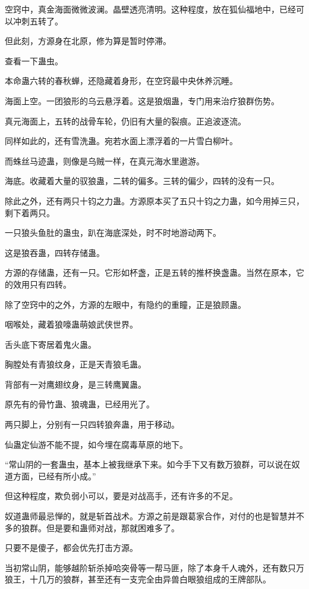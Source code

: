\begin{this_body}
空窍中，真金海面微微波澜。晶壁透亮清明。这种程度，放在狐仙福地中，已经可以冲刺五转了。

但此刻，方源身在北原，修为算是暂时停滞。

查看一下蛊虫。

本命蛊六转的春秋蝉，还隐藏着身形，在空窍最中央休养沉睡。

海面上空。一团狼形的乌云悬浮着。这是狼烟蛊，专门用来治疗狼群伤势。

真元海面上，五转的战骨车轮，仍旧有大量的裂痕。正追波逐流。

同样如此的，还有雪洗蛊。宛若水面上漂浮着的一片雪白柳叶。

而蛛丝马迹蛊，则像是乌贼一样，在真元海水里遨游。

海底。收藏着大量的驭狼蛊，二转的偏多。三转的偏少，四转的没有一只。

除此之外，还有两只十钧之力蛊。方源原本买了五只十钧之力蛊，如今用掉三只，剩下着两只。

一只狼头鱼肚的蛊虫，趴在海底深处，时不时地游动两下。

这是狼吞蛊，四转存储蛊。

方源的存储蛊，还有一只。它形如杯盏，正是五转的推杯换盏蛊。当然在原本，它的效用只有四转。

除了空窍中的之外，方源的左眼中，有隐约的重瞳，正是狼顾蛊。

咽喉处，藏着狼嚎蛊萌娘武侠世界。

舌头底下寄居着鬼火蛊。

胸膛处有青狼纹身，正是天青狼毛蛊。

背部有一对鹰翅纹身，是三转鹰翼蛊。

原先有的骨竹蛊、狼魂蛊，已经用光了。

两只脚上，分别有一只四转狼奔蛊，用于移动。

仙蛊定仙游不能不提，如今埋在腐毒草原的地下。

“常山阴的一套蛊虫，基本上被我继承下来。如今手下又有数万狼群，可以说在奴道方面，已经有所小成。”

但这种程度，欺负弱小可以，要是对战高手，还有许多的不足。

奴道蛊师最忌惮的，就是斩首战术。方源之前是跟葛家合作，对付的也是智慧并不多的狼群。但是要和蛊师对战，那就困难多了。

只要不是傻子，都会优先打击方源。

当初常山阴，能够越阶斩杀掉哈突骨等一帮马匪，除了本身千人魂外，还有数只万狼王，十几万的狼群，甚至还有一支完全由异兽白眼狼组成的王牌部队。


\end{this_body}
